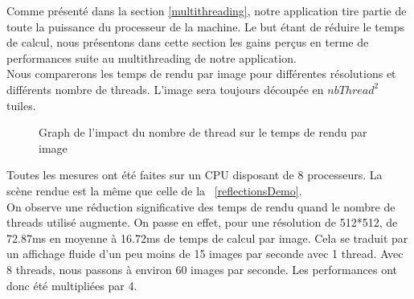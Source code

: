 \documentclass[../../Rapport RayTracer]{subfiles}
\begin{document}
Comme présenté dans la section \ref{multithreading}, notre application tire partie de toute la puissance du processeur de la machine.
Le but étant de réduire le temps de calcul, nous présentons dans cette section les gains perçus en terme de performances suite au multithreading de notre application.\\
Nous comparerons les temps de rendu par image pour différentes résolutions et différents nombre de threads. L'image sera toujours découpée en $nbThread^2$ tuiles.

\begin{figure}[h!]
	
	\caption{Graph de l'impact du nombre de thread sur le temps de rendu par image}
	\label{graphMultithreading}
\end{figure}
\FloatBarrier
Toutes les mesures ont été faites sur un CPU disposant de 8 processeurs. La scène rendue est la même que celle de la \figurename\ \ref{reflectionsDemo}.\\
On observe une réduction significative des temps de rendu quand le nombre de threads utilisé augmente. On passe en effet, pour une résolution de 512*512,
de 72.87ms en moyenne à 16.72ms de temps de calcul par image. Cela se traduit par un affichage fluide d'un peu moins de 15 images par seconde avec 1 thread.
Avec 8 threads, nous passons à environ 60 images par seconde. Les performances ont donc été multipliées par 4.\\
\end{document}
